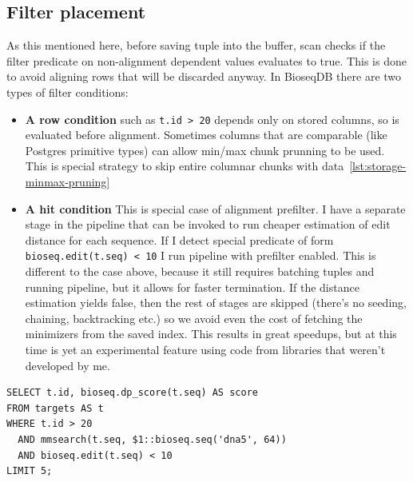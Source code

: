 \subsection{Filter placement}
\label{sec:filter-placement}

As this mentioned here, before saving tuple into the buffer, scan checks if the filter predicate on non-alignment dependent values evaluates to true. This is done to avoid aligning rows that will be discarded anyway.
In BioseqDB there are two types of filter conditions:

\begin{itemize}
  \item \textbf{A row condition} such as \texttt{t.id > 20} depends only on
    stored columns, so is evaluated before alignment. Sometimes columns that are comparable (like Postgres primitive types) can allow min/max chunk prunning to be used.
    This is special strategy to skip entire columnar chunks with data~\ref{lst:storage-minmax-pruning}
  \item \textbf{A hit condition} This is special case of alignment prefilter. I have a separate stage in the pipeline that can be invoked to run cheaper estimation of edit distance for each sequence.
  If I detect special predicate of form   
  \texttt{bioseq.edit(t.seq) < 10} I run pipeline with prefilter enabled. This is different to the case above, because it still requires batching tuples and running pipeline, but it allows for faster termination.
  If the distance estimation yields false, then the rest of stages are skipped (there's no seeding, chaining, backtracking etc.) so we avoid even the cost of fetching the minimizers from the saved index.
  This results in great speedups, but at this time is yet an experimental feature using code from libraries that weren't developed by me.
\end{itemize}

\noindent\begin{minipage}{\linewidth}
\begin{lstlisting}[style=bioseq-search-sql,caption={Filter input rows and then filter alignment hits.}]
SELECT t.id, bioseq.dp_score(t.seq) AS score
FROM targets AS t
WHERE t.id > 20
  AND mmsearch(t.seq, $1::bioseq.seq('dna5', 64))
  AND bioseq.edit(t.seq) < 10
LIMIT 5;
\end{lstlisting}
\end{minipage}


